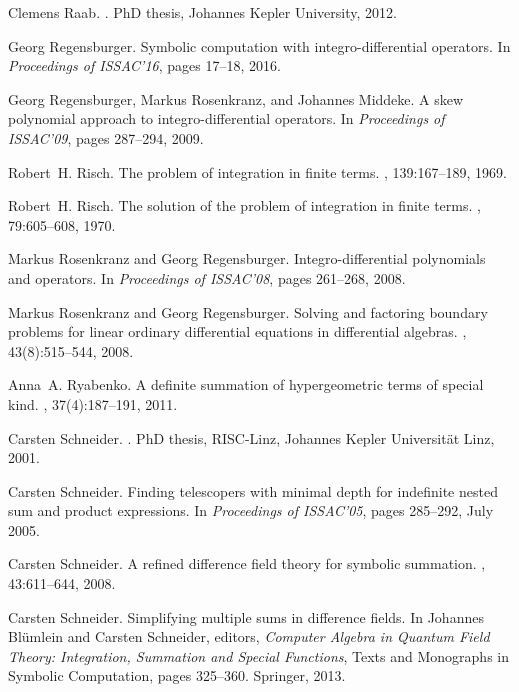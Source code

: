 \documentclass{jssc}
\begin{document}
\begin{thebibliography}{199}
Clemens Raab.
.
\newblock PhD thesis, Johannes Kepler University, 2012.

Georg Regensburger.
\newblock Symbolic computation with integro-differential operators.
\newblock In {\em Proceedings of ISSAC'16}, pages 17--18, 2016.

Georg Regensburger, Markus Rosenkranz, and Johannes Middeke.
\newblock A skew polynomial approach to integro-differential operators.
\newblock In {\em Proceedings of ISSAC'09}, pages 287--294, 2009.

Robert~H. Risch.
\newblock The problem of integration in finite terms.
,
  139:167--189, 1969.

Robert~H. Risch.
\newblock The solution of the problem of integration in finite terms.
, 79:605--608,
  1970.

Markus Rosenkranz and Georg Regensburger.
\newblock Integro-differential polynomials and operators.
\newblock In {\em Proceedings of ISSAC'08}, pages 261--268, 2008.

Markus Rosenkranz and Georg Regensburger.
\newblock Solving and factoring boundary problems for linear ordinary
  differential equations in differential algebras.
, 43(8):515--544, 2008.

Anna~A. Ryabenko.
\newblock A definite summation of hypergeometric terms of special kind.
, 37(4):187--191, 2011.

Carsten Schneider.
.
\newblock PhD thesis, RISC-Linz, Johannes Kepler Universit{\"a}t Linz, 2001.

Carsten Schneider.
\newblock Finding telescopers with minimal depth for indefinite nested sum and
  product expressions.
\newblock In {\em Proceedings of ISSAC'05}, pages 285--292, July 2005.

Carsten Schneider.
\newblock A refined difference field theory for symbolic summation.
, 43:611--644, 2008.

Carsten Schneider.
\newblock Simplifying multiple sums in difference fields.
\newblock In Johannes Bl{\"u}mlein and Carsten Schneider, editors, {\em
  Computer Algebra in Quantum Field Theory: Integration, Summation and Special
  Functions}, Texts and Monographs in Symbolic Computation, pages 325--360.
  Springer, 2013.


\end{thebibliography}
\end{document}

